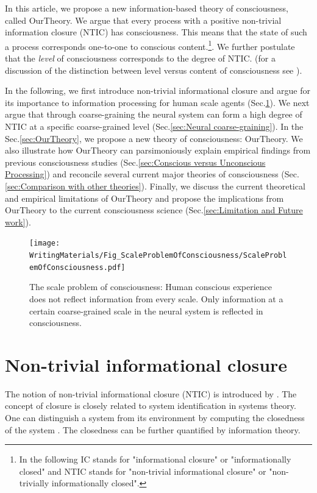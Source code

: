 \documentclass[utf8]{article}
\begin{document}
		In this article, we propose a new information-based theory of consciousness, called \ac{OurTheory}. We argue that every process with a positive non-trivial information closure (NTIC) has consciousness. This means that the state of such a process corresponds one-to-one to conscious content.\footnote{In the following IC stands for "informational closure" or "informationally closed" and NTIC stands for "non-trivial informational closure" or "non-trivially informationally closed".}. We further postulate that the \textit{level} of consciousness corresponds to the degree of NTIC. (for a discussion of the distinction between level versus content of consciousness see \cite{laureys2005neural, overgaard2010neural}).
		
		In the following, we first introduce non-trivial informational closure and argue for its importance to information processing for human scale agents (Sec.\ref{sec:Non-trivial informational closure}). We next argue that through coarse-graining the neural system can form a high degree of NTIC at a specific coarse-grained level (Sec.\ref{sec:Neural coarse-graining}). In the Sec.\ref{sec:OurTheory}, we propose a new theory of consciousness: \acf{OurTheory}. We also illustrate how \ac{OurTheory} can parsimoniously explain empirical findings from previous consciousness studies (Sec.\ref{sec:Conscious versus Unconscious Processing}) and reconcile several current major theories of consciousness (Sec.\ref{sec:Comparison with other theories}). Finally, we discuss the current theoretical and empirical limitations of \ac{OurTheory} and propose the implications from \ac{OurTheory} to the current consciousness science (Sec.\ref{sec:Limitation and Future work}). 


		\begin{figure}[H]
		    \centering
			\texttt{[image: WritingMaterials/Fig\_ScaleProblemOfConsciousness/ScaleProblemOfConsciousness.pdf]}
			\caption{The scale problem of consciousness: Human conscious experience does not reflect information from every scale. Only information at a certain coarse-grained scale in the neural system is reflected in consciousness.}
			\label{fig:scaleproblem}
	   	\end{figure}


	\section{Non-trivial informational closure} \label{sec:Non-trivial informational closure}
		The notion of non-trivial informational closure (NTIC) is introduced by \cite{BERTSCHINGER.2006}. The concept of closure is closely related to system identification in systems theory. One can distinguish a system from its environment by computing the closedness of the system \citep{maturana1991autopoiesis, rosen1991life, pattee2012evolving, luhmann1995probleme}. The closedness can be further quantified by information theory.
\end{document}
